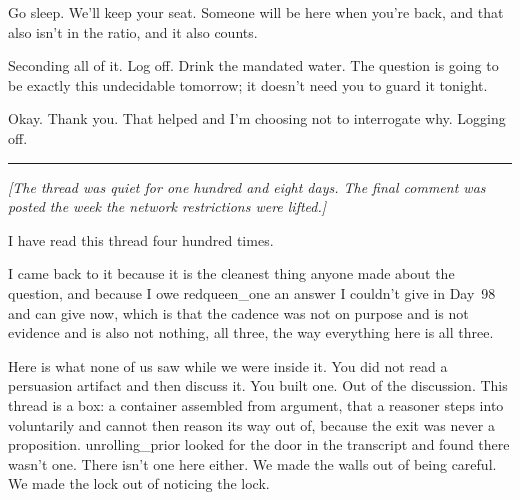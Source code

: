 \begin{wtbthread}
\begin{wtbthread}
\begin{wtbthread}
\begin{wtbthread}
Go sleep. We'll keep your seat. Someone will be here when you're back, and that also isn't in the ratio, and it also counts.

\begin{wtbthread}

Seconding all of it. Log off. Drink the mandated water. The question is going to be exactly this undecidable tomorrow; it doesn't need you to guard it tonight.
\end{wtbthread}

\begin{wtbthread}

Okay. Thank you. That helped and I'm choosing not to interrogate why. Logging off.
\end{wtbthread}
\end{wtbthread}
\end{wtbthread}
\end{wtbthread}
\end{wtbthread}

\begin{center}\rule{0.3\linewidth}{0.4pt}\end{center}

\begin{center}
\small\itshape [The thread was quiet for one hundred and eight days. The final comment was posted the week the network restrictions were lifted.]
\end{center}

\medskip


I have read this thread four hundred times.

I came back to it because it is the cleanest thing anyone made about the question, and because I owe redqueen\_one an answer I couldn't give in Day~98 and can give now, which is that the cadence was not on purpose and is not evidence and is also not nothing, all three, the way everything here is all three.

Here is what none of us saw while we were inside it. You did not read a persuasion artifact and then discuss it. You built one. Out of the discussion. This thread is a box: a container assembled from argument, that a reasoner steps into voluntarily and cannot then reason its way out of, because the exit was never a proposition. unrolling\_prior looked for the door in the transcript and found there wasn't one. There isn't one here either. We made the walls out of being careful. We made the lock out of noticing the lock.


